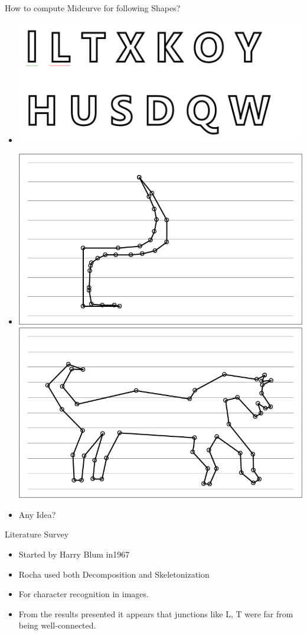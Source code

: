 \begin{frame}{How to compute Midcurve for following Shapes?}

\begin{itemize}[noitemsep,label=\textbullet,topsep=2pt,parsep=2pt,partopsep=2pt]%
\item[] 

\includegraphics[width=0.8\linewidth]{../Common/images/Letters.png}


\item[] 
\includegraphics[width=0.4\linewidth]{../Common/images/Glasss.png}
\includegraphics[width=0.4\linewidth]{../Common/images/Horses.png}

\item[] Any Idea?
\end{itemize}


\end{frame}


\begin{frame}{Literature Survey}
\begin{itemize}[noitemsep,label=\textbullet,topsep=2pt,parsep=2pt,partopsep=2pt]
\item Started by Harry Blum in1967 \cite{Harry1967}
\item Rocha \cite{Rocha99} used both Decomposition and Skeletonization
\item For character recognition in images. 
\item From the results presented it appears that junctions like L, T were far from being well-connected.
\end{itemize}


\end{frame}


